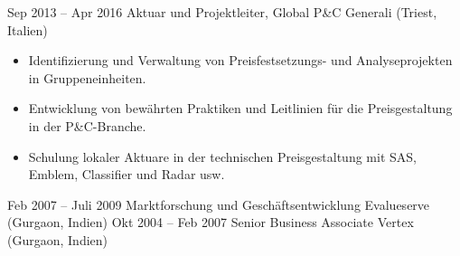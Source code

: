 \documentclass[a4paper,]{fortysecondscv}
\begin{document}
\begin{cvtable}
    \vspace{\topsep}
    \cvitem
    {Sep 2013 -- Apr 2016}
    {Aktuar und Projektleiter, Global P\&C}
    {Generali (Triest, Italien)}
    {
        \vspace{-\topsep}
        \begin{itemize}[nosep, leftmargin=0pt] %
            \item Identifizierung und Verwaltung von Preisfestsetzungs- und Analyseprojekten in Gruppeneinheiten.
            \item Entwicklung von bewährten Praktiken und Leitlinien für die Preisgestaltung in der P\&C-Branche.
            \item Schulung lokaler Aktuare in der technischen Preisgestaltung mit SAS, Emblem, Classifier und Radar usw.
        \end{itemize}
    }
    \vspace{\topsep}
    \cvitem
    {Feb 2007 -- Juli 2009}
    {Marktforschung und Geschäftsentwicklung}
    {Evalueserve (Gurgaon, Indien)}
    {
    }
    \vspace{\topsep}
    \cvitem
    {Okt 2004 -- Feb 2007}
    {Senior Business Associate}
    {Vertex (Gurgaon, Indien)}
    {
    }
\end{cvtable}




\end{document}
